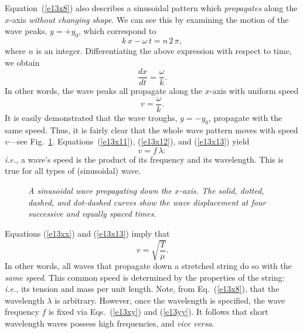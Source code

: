 Equation~(\ref{e13x8}) also describes a sinusoidal pattern which {\em propagates} along the $x$-axis {\em without
changing shape}. We can see this by examining the motion of the
wave peaks, $y=+y_0$, which correspond to
\begin{equation}
k\,x-\omega\,t = n\,2\,\pi,
\end{equation}
where $n$ is an integer. Differentiating the above expression with respect to time,
we obtain
\begin{equation}
\frac{d x}{dt} = \frac{\omega}{k}.
\end{equation}
In other words, the wave peaks all propagate along the $x$-axis with uniform speed
\begin{equation}
v=\frac{\omega}{k}. \label{e13x13}
\end{equation}
It is easily demonstrated that the wave troughs, $y = -y_0$,   propagate
with the same speed. Thus, it is fairly clear that the whole wave pattern
moves with speed $v$---see Fig.~\ref{f109}. Equations~(\ref{e13x11}), (\ref{e13x12}), and
(\ref{e13x13}) yield
\begin{equation}
v = f\,\lambda:\label{e13xy}
\end{equation}
{\em i.e.}, a wave's speed is the product of its frequency and its wavelength.
This is true for all types of (sinusoidal) wave.

\begin{figure}
\epsfysize=3in
\centerline{}
\caption{\em A sinusoidal wave propagating down the $x$-axis. The solid, dotted, dashed,
and dot-dashed curves show the wave displacement at four successive and equally spaced
times.}\label{f109}  
\end{figure}

Equations (\ref{e13xx}) and (\ref{e13x13}) imply that
\begin{equation}
v = \sqrt{\frac{T}{\mu}}.\label{e13yy}
\end{equation}
In other words, all waves that propagate down a stretched string do so with the
{\em same speed}. This common speed is determined by the properties of the
string: {\em i.e.}, its tension and  mass per unit length.
 Note, from Eq.~(\ref{e13x8}), that the wavelength $\lambda$ 
is arbitrary. However, once the wavelength is specified, the wave frequency $f$ is
fixed via Eqs.~(\ref{e13xy}) and (\ref{e13yy}). It follows that short wavelength
waves possess high frequencies, and {\em vice versa}.

